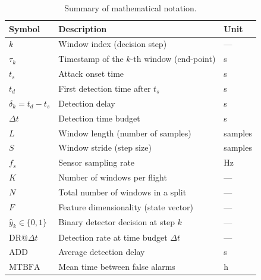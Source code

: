 
\begin{table}[!t]
\caption{Summary of mathematical notation.}
\label{tab:notation}
\centering
\begin{tabular}{lll}
\toprule
\textbf{Symbol} & \textbf{Description} & \textbf{Unit} \\
\midrule
$k$          & Window index (decision step)          & --- \\
$\tau_k$     & Timestamp of the $k$-th window (end-point) & s \\
$t_s$        & Attack onset time                     & s \\
$t_d$        & First detection time after $t_s$      & s \\
$\delta_k = t_d - t_s$ & Detection delay             & s \\
$\Delta t$   & Detection time budget                 & s \\
$L$          & Window length (number of samples)     & samples \\
$S$          & Window stride (step size)             & samples \\
$f_s$        & Sensor sampling rate                  & Hz \\
$K$          & Number of windows per flight          & --- \\
$N$          & Total number of windows in a split    & --- \\
$F$          & Feature dimensionality (state vector) & --- \\
$\hat{y}_k \in \{0,1\}$ & Binary detector decision at step $k$ & --- \\
$\text{DR}@\Delta t$  & Detection rate at time budget $\Delta t$ & --- \\
$\text{ADD}$ & Average detection delay               & s \\
$\text{MTBFA}$ & Mean time between false alarms      & h \\
\bottomrule
\end{tabular}
\end{table}
